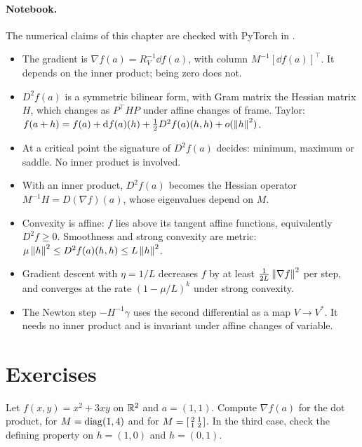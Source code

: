 \begin{notechapter}
\paragraph{Notebook.} The numerical claims of this chapter are checked
with PyTorch in .

\begin{chaptersummary}
\begin{itemize}[nosep]
  \item The gradient is $\nabla f(a) = R_V^{-1}\dd f(a)$, with column
        $M^{-1}[\dd f(a)]^\top$. It depends on the inner product; being
        zero does not.
  \item $D^2f(a)$ is a symmetric bilinear form, with Gram matrix the
        Hessian matrix $H$, which changes as $P^\top HP$ under affine
        changes of frame. Taylor:
        $f(a + h) = f(a) + \mathrm{d} f(a)(h) + \frac12D^2f(a)(h, h)
        + o(\left\|h\right\|^2)$.
  \item At a critical point the signature of $D^2f(a)$ decides: minimum,
        maximum or saddle. No inner product is involved.
  \item With an inner product, $D^2f(a)$ becomes the Hessian operator
        $M^{-1}H = D(\nabla f)(a)$, whose eigenvalues depend on $M$.
  \item Convexity is affine: $f$ lies above its tangent affine functions,
        equivalently $D^2f\geq0$. Smoothness and strong convexity are
        metric: $\mu\left\|h\right\|^2\leq D^2f(a)(h, h)\leq L\left\|h\right\|^2$.
  \item Gradient descent with $\eta = 1/L$ decreases $f$ by at least
        $\frac1{2L}\left\|\nabla f\right\|^2$ per step, and converges at the rate
        $(1 - \mu/L)^k$ under strong convexity.
  \item The Newton step $-H^{-1}\gamma$ uses the second differential as a
        map $V\to V^*$. It needs no inner product and is invariant under
        affine changes of variable.
\end{itemize}
\end{chaptersummary}

\section*{Exercises}

\begin{exercise}\label{gradient-hessian:exr:1}
Let $f(x, y) = x^2 + 3xy$ on $\mathbb{R}^2$ and $a = (1, 1)$. Compute
$\nabla f(a)$ for the dot product, for $M = \operatorname{diag}(1, 4)$ and for
$M = \begin{bsmallmatrix}2 & 1\\1 & 2\end{bsmallmatrix}$. In the third
case, check the defining property on $h = (1, 0)$ and $h = (0, 1)$.
\end{exercise}


\end{notechapter}
